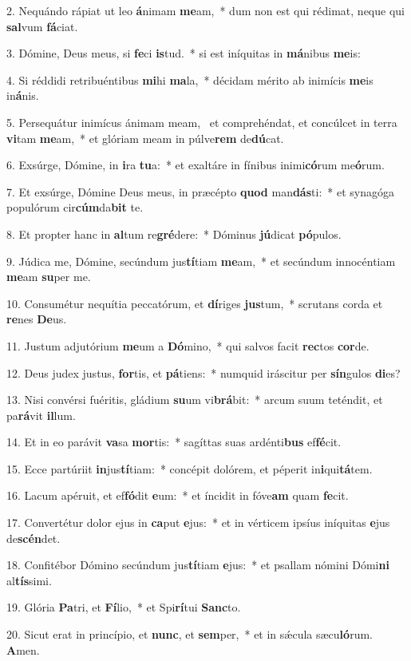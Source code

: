 2. Nequándo rápiat ut leo \textbf{á}nimam \textbf{me}am,~*  dum non est qui rédimat, neque qui \textbf{sal}vum \textbf{fá}ciat.\

3. Dómine, Deus meus, si \textbf{fe}ci \textbf{is}tud.~*  si est iníquitas in \textbf{má}nibus \textbf{me}is:\

4. Si réddidi retribuéntibus \textbf{mi}hi \textbf{ma}la,~*  décidam mérito ab inimícis \textbf{me}is in\textbf{á}nis.\

5. Persequátur inimícus ánimam meam, \dag\  et comprehéndat, et concúlcet in terra \textbf{vi}tam \textbf{me}am,~*  et glóriam meam in púlve\textbf{rem} de\textbf{dú}cat.\

6. Exsúrge, Dómine, in \textbf{i}ra \textbf{tu}a:~*  et exaltáre in fínibus inimi\textbf{có}rum me\textbf{ó}rum.\

7. Et exsúrge, Dómine Deus meus, in præcépto \textbf{quod} man\textbf{dás}ti:~*  et synagóga populórum cir\textbf{cúm}da\textbf{bit} te.\

8. Et propter hanc in \textbf{al}tum re\textbf{gré}dere:~*  Dóminus \textbf{jú}dicat \textbf{pó}pulos.\

9. Júdica me, Dómine, secúndum jus\textbf{tí}tiam \textbf{me}am,~*  et secúndum innocéntiam \textbf{me}am \textbf{su}per me.\

10. Consumétur nequítia peccatórum, et \textbf{dí}riges \textbf{jus}tum,~*  scrutans corda et \textbf{re}nes \textbf{De}us.\

11. Justum adjutórium \textbf{me}um a \textbf{Dó}mino,~*  qui salvos facit \textbf{rec}tos \textbf{cor}de.\

12. Deus judex justus, \textbf{for}tis, et \textbf{pá}tiens:~*  numquid iráscitur per \textbf{sín}gulos \textbf{di}es?\

13. Nisi convérsi fuéritis, gládium \textbf{su}um vi\textbf{brá}bit:~*  arcum suum teténdit, et pa\textbf{rá}vit \textbf{il}lum.\

14. Et in eo parávit \textbf{va}sa \textbf{mor}tis:~*  sagíttas suas ardénti\textbf{bus} ef\textbf{fé}cit.\

15. Ecce partúriit \textbf{in}jus\textbf{tí}tiam:~*  concépit dolórem, et péperit in\textbf{i}qui\textbf{tá}tem.\

16. Lacum apéruit, et ef\textbf{fó}dit \textbf{e}um:~*  et íncidit in fóve\textbf{am} quam \textbf{fe}cit.\

17. Convertétur dolor ejus in \textbf{ca}put \textbf{e}jus:~*  et in vérticem ipsíus iníquitas \textbf{e}jus de\textbf{scén}det.\

18. Confitébor Dómino secúndum jus\textbf{tí}tiam \textbf{e}jus:~*  et psallam nómini Dómi\textbf{ni} al\textbf{tís}simi.\

19. Glória \textbf{Pa}tri, et \textbf{Fí}lio,~*  et Spi\textbf{rí}tui \textbf{Sanc}to.\

20. Sicut erat in princípio, et \textbf{nunc}, et \textbf{sem}per,~*  et in sǽcula sæcu\textbf{ló}rum. \textbf{A}men.\

